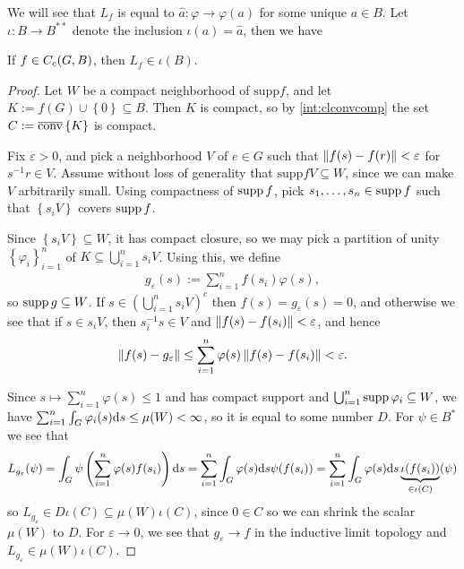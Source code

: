 We will see that $L_f$ is equal to $\hat a \colon \varphi \to \varphi(a)$ for some unique $a \in B$. Let $\iota \colon B \to B^{**}$ denote the inclusion $\iota(a) = \hat a$, then we have
\begin{lemma}
If $f \in C_c(G,B)$, then $L_f \in \iota(B)$.
\label{int:defintegral}
\end{lemma}
\begin{proof}
Let $W$ be a compact neighborhood of $\mathrm{supp} f$, and let $K:= f(G) \cup \left\{ 0 \right\} \subseteq B$. Then $K$ is compact, so by \ref{int:clconvcomp} the set $C := \overline {\operatorname{conv}} \left\{ K \right\}$ is compact.

Fix $\varepsilon > 0$, and pick a neighborhood $V$ of $e \in G$ such that $ \left\lVert f(s) - f(r) \right\rVert < \varepsilon$ for $s^{-1}r \in V$. Assume without loss of generality that $\mathrm{supp} f V \subseteq W$, since we can make $V$ arbitrarily small. Using compactness of $\operatorname{supp} f$, pick $s_1,\dots,s_n \in \operatorname{supp} f$ such that $\left\{ s_i V \right\}$ covers $\operatorname{supp} f$.

Since $ \left\{ s_i V \right\} \subseteq W$, it has compact closure, so we may pick a partition of unity $\left\{ \varphi_i \right\}_{i=1}^n$ of $ K \subseteq \bigcup_{i=1}^n s_i V$. Using this, we define 
\begin{align*}
	g_\varepsilon (s) := \sum_{i=1}^n f(s_i) \varphi(s),
\end{align*}
so $\operatorname{supp} g \subseteq W$. If $s \in \left( \bigcup_{i=1}^n s_i V \right)^c$ then $f(s) = g_{\varepsilon}(s) = 0$, and otherwise we see that if $s \in s_i V$, then $s_i^{-1}s \in V$ and $\left\lVert f(s) - f(s_i) \right\rVert < \varepsilon$, and hence
\begin{align*}
	\left\lVert f(s) - g_{\varepsilon} \right\rVert  \leq \sum_{i=1}^n \varphi(s) \left\lVert f(s)-f(s_i) \right\rVert  < \varepsilon.
\end{align*}

Since $s \mapsto \sum_{i=1}^n \varphi(s) \leq 1$ and has compact support and $\bigcup_{i=1}^n \operatorname{supp} \varphi_i \subseteq W$, we have $\sum_{i=1}^n \int_G \varphi_i(s) \mathrm{d} s \leq \mu(W) < \infty$, so it is equal to some number $D$. For $\psi \in B^*$ we see that
\begin{align*}
	L_{g_{\varepsilon}} ( \psi ) = \int_{G} \psi\left( \sum_{i=1}^n \varphi(s) f(s_i) \right) \mathrm{d} s = \sum_{i=1}^n \int_G \varphi(s) \mathrm{d} s \psi(f(s_i)) = \sum_{i=1}^n \int_G \varphi(s) \mathrm{d} s \underbrace{\iota(f(s_i))}_{ \in \iota(C)} (\psi) 
\end{align*}
so $L_{g_{\varepsilon}}  \in D \iota(C) \subseteq \mu(W) \iota(C)$, since $0 \in C$ so we can shrink the scalar $\mu(W)$ to $D$. For $\varepsilon \to 0$, we see that $g_{\varepsilon} \to f$ in the inductive limit topology and $L_{g_\varepsilon} \in \mu(W) \iota(C)$. 


\end{proof}
